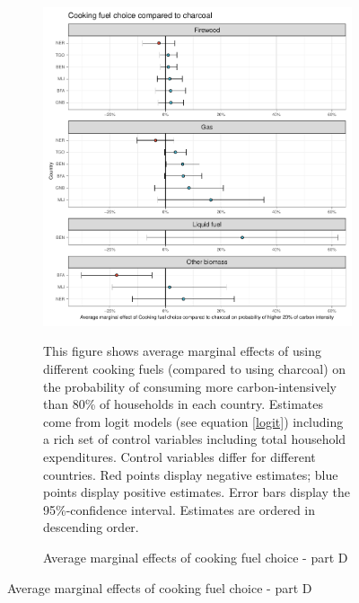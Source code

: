  \begin{figure}[ht!]\ContinuedFloat
   \centering
   \begin{subfigure}[b]{\textwidth}
   \centering
   \includegraphics{1_Figures/Analysis_Logit_Models_Marginal_Effects/Average_Marginal_Effects_affected_upper_80_CF_Charcoal_2017B.pdf}
   \caption{Average marginal effects of cooking fuel choice - part D} \label{fig:Logit_ME_CF_4}
   \begin{subcaption2}
     This figure shows average marginal effects of using different cooking fuels (compared to using charcoal) on the probability of consuming more carbon-intensively than 80\% of households in each country. Estimates come from logit models (see equation \ref{logit}) including a rich set of control variables including total household expenditures. Control variables differ for different countries. Red points display negative estimates; blue points display positive estimates. Error bars display the 95\%-confidence interval. Estimates are ordered in descending order.
   \end{subcaption2}
   \end{subfigure}
 \end{figure}
 \clearpage
